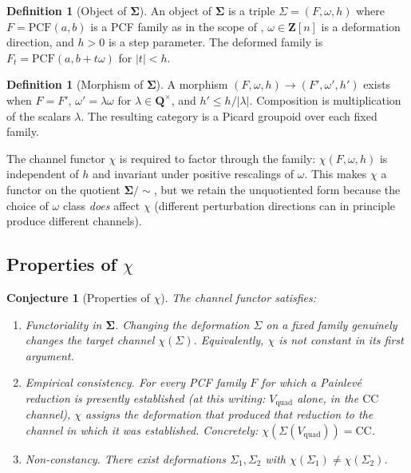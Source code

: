 \documentclass[11pt,reqno]{amsart}
\theoremstyle{plain}
\newtheorem{conjecture}[theorem]{Conjecture}
\theoremstyle{definition}
\newtheorem{definition}[theorem]{Definition}
\theoremstyle{remark}
\newcommand{\Sigmaspace}{\mathbf{\Sigma}}
\newcommand{\PCF}{\mathrm{PCF}}
\newcommand{\CC}{\mathrm{CC}}
\newcommand{\Vquad}{V_{\mathrm{quad}}}
\begin{document}
\begin{definition}[Object of $\Sigmaspace$]
An object of $\Sigmaspace$ is a triple
$\Sigma = (F, \omega, h)$ where $F = \PCF(a, b)$ is a PCF
family as in the scope of , $\omega \in
\mathbf{Z}[n]$ is a deformation direction, and $h > 0$ is a
step parameter. The deformed family is
$F_t = \PCF(a, b + t \omega)$ for $|t| < h$.
\end{definition}

\begin{definition}[Morphism of $\Sigmaspace$]
A morphism
$(F, \omega, h) \to (F', \omega', h')$ exists when $F = F'$,
$\omega' = \lambda \omega$ for $\lambda \in \mathbf{Q}^\times$,
and $h' \le h / |\lambda|$. Composition is multiplication of
the scalars $\lambda$. The resulting category is a Picard
groupoid over each fixed family.
\end{definition}

The channel functor $\chi$ is required to factor through the
family: $\chi(F, \omega, h)$ is independent of $h$ and
invariant under positive rescalings of $\omega$. This makes
$\chi$ a functor on the quotient $\Sigmaspace / \sim$, but
we retain the unquotiented form because the choice of
$\omega$ class \emph{does} affect $\chi$ (different
perturbation directions can in principle produce different
channels).

\subsection{Properties of $\chi$}

\begin{conjecture}[Properties of $\chi$]
\label{conj:chi}
The channel functor satisfies:
\begin{enumerate}[label=(\roman*)]
\item \emph{Functoriality in $\Sigmaspace$.} Changing the
deformation $\Sigma$ on a fixed family genuinely changes the
target channel $\chi(\Sigma)$. Equivalently, $\chi$ is not
constant in its first argument.
\item \emph{Empirical consistency.} For every PCF family
$F$ for which a Painlev\'e reduction is presently established
(at this writing: $\Vquad$ alone, in the $\CC$ channel),
$\chi$ assigns the deformation that produced that reduction
to the channel in which it was established. Concretely:
$\chi(\Sigma(\Vquad)) = \CC$.
\item \emph{Non-constancy.} There exist deformations
$\Sigma_1, \Sigma_2$ with $\chi(\Sigma_1) \ne \chi(\Sigma_2)$.
\end{enumerate}
\end{conjecture}
\end{document}
